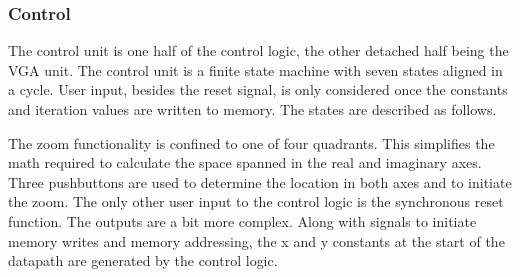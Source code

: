 \documentclass[titlepage]{article}      %
\begin{document}
\subsubsection{Control}
The control unit is one half of the control logic, the other detached half being the VGA unit. The control unit is a finite state machine with seven states aligned in a cycle. User input, besides the reset signal, is only considered once the constants and iteration values are written to memory. The states are described as follows.
\begin{table}[H]
\centering
{}
\caption{Control logic finite state machine stage listing}
\end{table}
The zoom functionality is confined to one of four quadrants. This simplifies the math required to calculate the space spanned in the real and imaginary axes. Three pushbuttons are used to determine the location in both axes and to initiate the zoom. The only other user input to the control logic is the synchronous reset function. The outputs are a bit more complex. Along with signals to initiate memory writes and memory addressing, the x and y constants at the start of the datapath are generated by the control logic.
\begin{table}[H]
\centering
{}
\caption{Control logic output signals}
\end{table}
\end{document}
